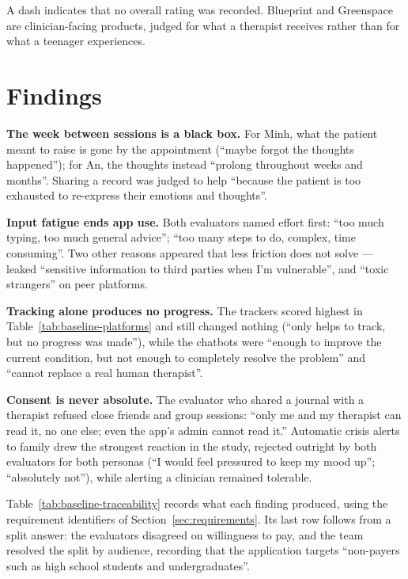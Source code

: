 A dash indicates that no overall rating was recorded. Blueprint and Greenspace are clinician-facing products, judged for what a therapist receives rather than for what a teenager experiences.

\section{Findings}

\textbf{The week between sessions is a black box.} For Minh, what the patient meant to raise is gone by the appointment (``maybe forgot the thoughts happened''); for An, the thoughts instead ``prolong throughout weeks and months''. Sharing a record was judged to help ``because the patient is too exhausted to re-express their emotions and thoughts''.

\textbf{Input fatigue ends app use.} Both evaluators named effort first: ``too much typing, too much general advice''; ``too many steps to do, complex, time consuming''. Two other reasons appeared that less friction does not solve --- leaked ``sensitive information to third parties when I'm vulnerable'', and ``toxic strangers'' on peer platforms.

\textbf{Tracking alone produces no progress.} The trackers scored highest in Table~\ref{tab:baseline-platforms} and still changed nothing (``only helps to track, but no progress was made''), while the chatbots were ``enough to improve the current condition, but not enough to completely resolve the problem'' and ``cannot replace a real human therapist''.

\textbf{Consent is never absolute.} The evaluator who shared a journal with a therapist refused close friends and group sessions: ``only me and my therapist can read it, no one else; even the app's admin cannot read it.'' Automatic crisis alerts to family drew the strongest reaction in the study, rejected outright by both evaluators for both personas (``I would feel pressured to keep my mood up''; ``absolutely not''), while alerting a clinician remained tolerable.

Table~\ref{tab:baseline-traceability} records what each finding produced, using the requirement identifiers of Section~\ref{sec:requirements}. Its last row follows from a split answer: the evaluators disagreed on willingness to pay, and the team resolved the split by audience, recording that the application targets ``non-payers such as high school students and undergraduates''.

